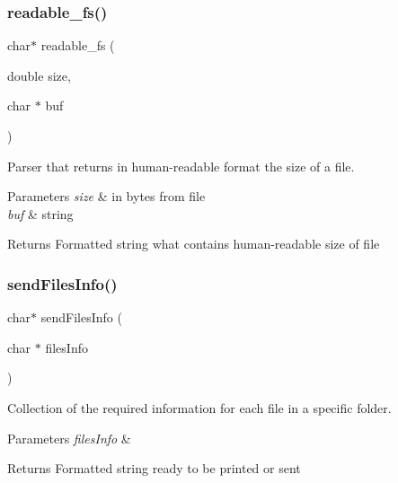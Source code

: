 \mbox{\label{files_8c_a0fee72390d56ff2ec8ea2b6f2c423f5b}} 
\subsubsection{readable\+\_\+fs()}
{\footnotesize\ttfamily char$\ast$ readable\+\_\+fs (\begin{DoxyParamCaption}\item[{double}]{size,  }\item[{char $\ast$}]{buf }\end{DoxyParamCaption})}



Parser that returns in human-\/readable format the size of a file. 


\begin{DoxyParams}{Parameters}
{\em size} & in bytes from file \\
\hline
{\em buf} & string \\
\hline
\end{DoxyParams}
\begin{DoxyReturn}{Returns}
Formatted string what contains human-\/readable size of file 
\end{DoxyReturn}
\mbox{\label{files_8c_a31c6dc9ce767584979bcd916919f66fc}} 
\subsubsection{send\+Files\+Info()}
{\footnotesize\ttfamily char$\ast$ send\+Files\+Info (\begin{DoxyParamCaption}\item[{char $\ast$}]{files\+Info }\end{DoxyParamCaption})}



Collection of the required information for each file in a specific folder. 


\begin{DoxyParams}{Parameters}
{\em files\+Info} & \\
\hline
\end{DoxyParams}
\begin{DoxyReturn}{Returns}
Formatted string ready to be printed or sent 
\end{DoxyReturn}
